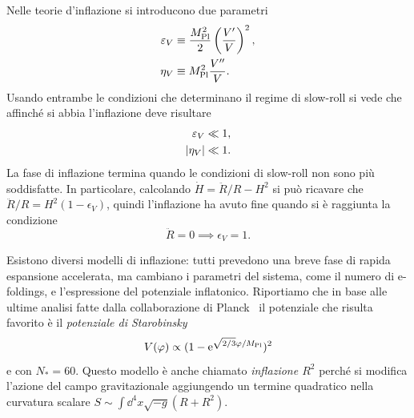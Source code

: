 Nelle teorie d'inflazione si introducono due parametri
\begin{align}
  \epsilon_{V} &\equiv
  \frac{M_{\textup{Pl}}^{2}}{2}\left(\frac{V'}{V}\right)^{2}, \\
  \eta_{V} &\equiv M_{\textup{Pl}}^{2}\frac{V''}{V}.
\end{align}
Usando entrambe le condizioni che determinano il regime di slow-roll si vede che
affinché si abbia l'inflazione deve risultare
\begin{align}
  \epsilon_{V} &\ll 1, \\
  \abs{\eta_{V}} &\ll 1.
\end{align}
La fase di inflazione termina quando le condizioni di slow-roll non sono più
soddisfatte.  In particolare, calcolando \(\dot{H} = \ddot{R}/R - H^{2}\) si può
ricavare che \(\ddot{R}/R = H^{2}(1 - \epsilon_{V})\), quindi l'inflazione ha
avuto fine quando si è raggiunta la condizione
\begin{equation}
  \ddot{R} = 0 \implies \epsilon_{V} = 1.
\end{equation}

Esistono diversi modelli di inflazione: tutti prevedono una breve fase di rapida
espansione accelerata, ma cambiano i parametri del sistema, come il numero di
e-foldings, e l'espressione del potenziale inflatonico.  Riportiamo che in base
alle ultime analisi fatte dalla collaborazione di
Planck~\parencite{2015arXiv150202114P} il potenziale che risulta favorito è il
\emph{potenziale di Starobinsky}
\begin{equation}
  V(\phi) \propto (1 - \e^{\sqrt{2/3}\phi/M_{\textup{Pl}}})^{2}
\end{equation}
e con \(N_{*} = 60\).  Questo modello è anche chiamato \emph{inflazione
  \(R^{2}\)} perché si modifica l'azione del campo gravitazionale aggiungendo un
termine quadratico nella curvatura scalare \(S \sim \int\dd^{4}x\sqrt{-g}(R +
R^{2})\).

